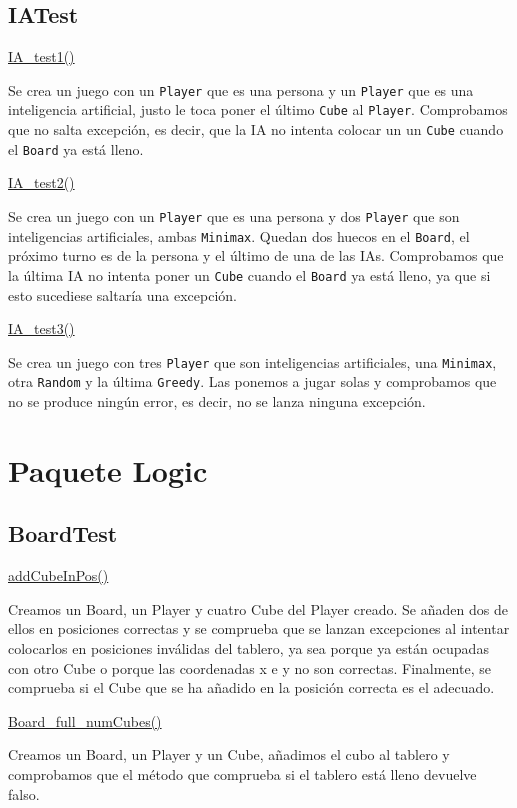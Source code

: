 \documentclass[../DocumentoOficial.tex]{subfiles}
\begin{document}
\subsection{IATest}
\underline{IA\_test1()}

Se crea un juego con un \texttt{Player} que es una persona y un \texttt{Player} que es una inteligencia artificial, justo le toca poner el último \texttt{Cube} al \texttt{Player}. Comprobamos que no salta excepción, es decir, que la IA no intenta colocar un un \texttt{Cube} cuando el \texttt{Board} ya está lleno.

\underline{IA\_test2()}

Se crea un juego con un \texttt{Player} que es una persona y dos \texttt{Player} que son inteligencias artificiales, ambas \texttt{Minimax}. Quedan dos huecos en el \texttt{Board}, el próximo turno es de la persona y el último de una de las IAs. Comprobamos que la última IA no intenta poner un \texttt{Cube} cuando el \texttt{Board} ya está lleno, ya que si esto sucediese saltaría una excepción.

\underline{IA\_test3()}

Se crea un juego con tres \texttt{Player} que son inteligencias artificiales, una \texttt{Minimax}, otra \texttt{Random} y la última \texttt{Greedy}. Las ponemos a jugar solas y comprobamos que no se produce ningún error, es decir, no se lanza ninguna excepción.

\section{Paquete Logic}
\subsection{BoardTest}
\underline{addCubeInPos()}

Creamos un Board, un Player y cuatro Cube del Player creado. Se añaden dos de ellos en posiciones correctas y se comprueba que se lanzan excepciones al intentar colocarlos en posiciones inválidas del tablero, ya sea porque ya están ocupadas con otro Cube o porque las coordenadas x e y no son correctas. Finalmente, se comprueba si el Cube que se ha añadido en la posición correcta es el adecuado.

\underline{Board\_full\_numCubes()}

Creamos un Board, un Player y un Cube, añadimos el cubo al tablero y comprobamos que el método que comprueba si el tablero está lleno devuelve falso.
\end{document}

